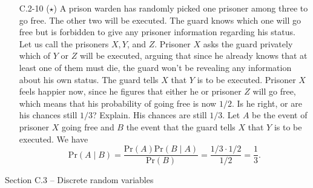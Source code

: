 \documentclass{report}
\makeatletter
\renewenvironment{framed}{%
 \def\FrameCommand##1{\hskip\@totalleftmargin
 \fboxsep=\FrameSep\fbox{##1}}%
 \MakeFramed {\advance\hsize-\width
   \@totalleftmargin\z@ \linewidth\hsize
   \@setminipage}}%
 {\par\unskip\endMakeFramed}
\makeatother
\begin{document}
\begin{enumerate}
\item[C.2{-}10] {($\star$) A prison warden has randomly picked one prisoner
  among three to go free. The other two will be executed. The guard knows which
  one will go free but is forbidden to give any prisoner information regarding
  his status. Let us call the prisoners $X, Y$, and $Z$. Prisoner $X$ asks the
  guard privately which of $Y$ or $Z$ will be executed, arguing that since he
  already knows that at least one of them must die, the guard won't be revealing
  any information about his own status. The guard tells $X$ that $Y$ is to be
  executed.  Prisoner $X$ feels happier now, since he figures that either he or
  prisoner $Z$ will go free, which means that his probability of going free is
  now $1/2$. Is he right, or are his chances still $1/3$? Explain.}
\begin{framed}
  His chances are still $1/3$. Let $A$ be the event of prisoner $X$ going free
  and $B$ the event that the guard tells $X$ that $Y$ is to be executed. We have
  \[
    \text{Pr}(A\;|\;B) = \frac{\text{Pr}(A) \text{Pr}(B\;|\;A)}{\text{Pr}(B)} = \frac{1/3 \cdot 1/2}{1/2} = \frac{1}{3}.
  \]
\end{framed}

\end{enumerate}

\newpage

{\large Section C.3 {--} Discrete random variables}
\end{document}
